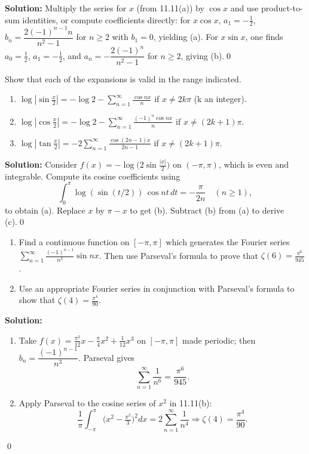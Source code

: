 \noindent\textbf{Solution:}
Multiply the series for $x$ (from 11.11(a)) by $\cos x$ and use product-to-sum identities, or compute coefficients directly: for $x\cos x$, $a_1= -\tfrac{1}{2}$, $b_n=\dfrac{2(-1)^{n-1}n}{n^2-1}$ for $n\ge2$ with $b_1=0$, yielding (a). For $x\sin x$, one finds $a_0=\tfrac{1}{2}$, $a_1=-\tfrac{1}{2}$, and $a_n= -\dfrac{2(-1)^n}{n^2-1}$ for $n\ge2$, giving (b).\qed


\begin{problembox}
Show that each of the expansions is valid in the range indicated.
\begin{enumerate}[label=(\alph*)]
\item $\log \left| \sin \frac{x}{2} \right| = -\log 2 - \sum_{n=1}^\infty \frac{\cos nx}{n}$ if $x \neq 2k\pi$ (k an integer).
\item $\log \left| \cos \frac{x}{2} \right| = -\log 2 - \sum_{n=1}^\infty \frac{(-1)^n \cos nx}{n}$ if $x \neq (2k + 1)\pi$.
\item $\log \left| \tan \frac{x}{2} \right| = -2 \sum_{n=1}^\infty \frac{\cos (2n - 1)x}{2n - 1}$ if $x \neq (2k + 1)\pi$.
\end{enumerate}
\end{problembox}

\noindent\textbf{Solution:}
Consider $f(x)= -\log\big(2\sin\tfrac{|x|}{2}\big)$ on $(-\pi,\pi)$, which is even and integrable. Compute its cosine coefficients using
\[\int_0^{\pi} \log(\sin(t/2))\,\cos nt\,dt = -\frac{\pi}{2n}\quad (n\ge1),\]
to obtain (a). Replace $x$ by $\pi-x$ to get (b). Subtract (b) from (a) to derive (c).\qed


\begin{problembox}
\begin{enumerate}[label=(\alph*)]
\item Find a continuous function on $[-\pi, \pi]$ which generates the Fourier series $\sum_{n=1}^\infty \frac{(-1)^{n-1}}{n^3} \sin nx$. Then use Parseval's formula to prove that $\zeta(6) = \frac{\pi^6}{945}$.
\item Use an appropriate Fourier series in conjunction with Parseval's formula to show that $\zeta(4) = \frac{\pi^4}{90}$.
\end{enumerate}
\end{problembox}

\noindent\textbf{Solution:}
\begin{enumerate}[label=(\alph*)]
\item Take $f(x)=\tfrac{\pi^2}{12}x-\tfrac{\pi}{4}x^2+\tfrac{1}{12}x^3$ on $[-\pi,\pi]$ made periodic; then $b_n=\dfrac{(-1)^{n-1}}{n^3}$. Parseval gives
\[\sum_{n=1}^{\infty}\frac{1}{n^6}=\frac{\pi^6}{945}.\]
\item Apply Parseval to the cosine series of $x^2$ in 11.11(b):
\[\frac{1}{\pi}\int_{-\pi}^{\pi}\big(x^2-\tfrac{\pi^2}{3}\big)^2 dx = 2\sum_{n=1}^{\infty}\frac{1}{n^4}\Rightarrow \zeta(4)=\frac{\pi^4}{90}.\]
\end{enumerate}\qed


